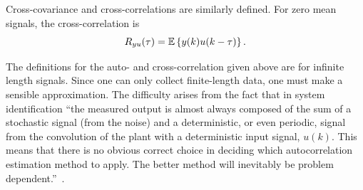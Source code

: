 Cross-covariance and cross-correlations are similarly defined. For zero mean signals, the cross-correlation is
\begin{equation*}
  R_{yu}(\tau) = \mathbb{E}\left\{y(k)u(k-\tau)\right\}.
\end{equation*}

The definitions for the auto- and cross-correlation given above are for infinite length signals. Since one can only collect finite-length data, one must make a sensible approximation. The difficulty arises from the fact that in system identification ``the measured output is almost always composed of the sum of a stochastic signal (from the noise) and a deterministic, or even periodic, signal from the convolution of the plant with a deterministic input signal, $u(k)$. This means that there is no obvious correct choice in deciding which autocorrelation estimation method to apply. The better method will inevitably be problem dependent.''~\cite{smith-suppl4}.


